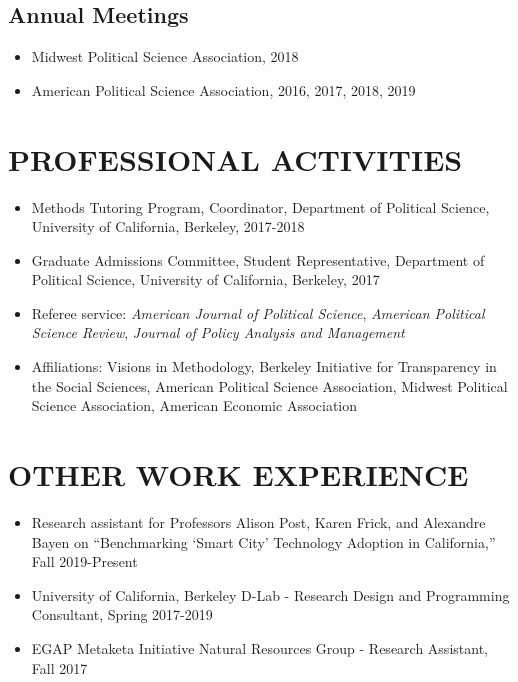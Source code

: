 \documentclass[11pt]{article}
\begin{document}
\subsection*{Annual Meetings}

\begin{itemize}[nosep]
\item[]Midwest Political Science Association, 2018
	\item[]American Political Science Association, 2016, 2017, 2018, 2019 	
	
	
\end{itemize}

\vspace{3mm}
\section*{PROFESSIONAL ACTIVITIES}


\begin{itemize}	

\item[]Methods Tutoring Program, Coordinator, Department of Political Science, University of California, Berkeley, 2017-2018
\item[]Graduate Admissions Committee, Student Representative, Department of Political Science, University of California, Berkeley, 2017
\item[]Referee service: \textit{American Journal of Political Science}, \textit{American Political Science Review}, \textit{Journal of Policy Analysis and Management}
\item[]Affiliations: Visions in Methodology, Berkeley Initiative for Transparency in the Social Sciences, American Political Science Association, Midwest Political Science Association, American Economic Association
\end{itemize}


\vspace{3mm}
\section*{OTHER WORK EXPERIENCE}
	\begin{itemize}
	\item[]Research assistant for Professors Alison Post, Karen Frick, and Alexandre Bayen on ``Benchmarking `Smart City' Technology Adoption in California,'' Fall 2019-Present
	\item[]University of California, Berkeley D-Lab - Research Design and Programming Consultant, Spring 2017-2019
	\item[]EGAP Metaketa Initiative Natural Resources Group - Research Assistant, Fall 2017
\end{itemize}
\end{document}
